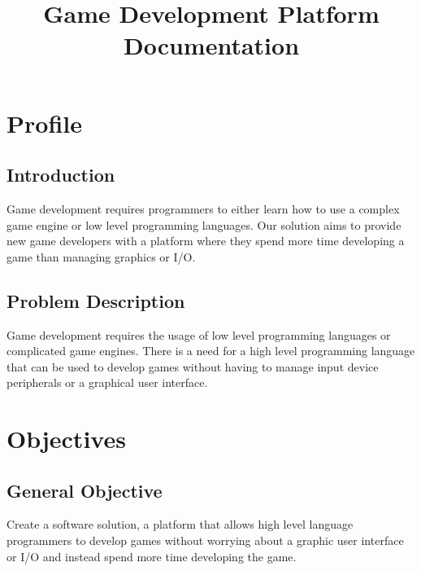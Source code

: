 \documentclass[a4paper,12pt]{article}
\title{Game Development Platform Documentation}
\author{}
\date{}
\begin{document}
\maketitle

\tableofcontents
\newpage

\section{Profile}

\subsection{Introduction}
Game development requires programmers to either learn how to use a complex game engine or low level programming languages. Our solution aims to provide new game developers with a platform where they spend more time developing a game than managing graphics or I/O.

\subsection{Problem Description}
Game development requires the usage of low level programming languages or complicated game engines. There is a need for a high level programming language that can be used to develop games without having to manage input device peripherals or a graphical user interface.

\section{Objectives}

\subsection{General Objective}
Create a software solution, a platform that allows high level language programmers to develop games without worrying about a graphic user interface or I/O and instead spend more time developing the game.
\end{document}
